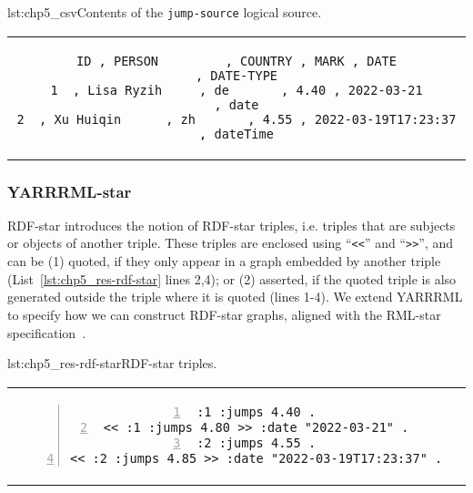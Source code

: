 \noindent\begin{minipage}{\linewidth}
\centering
\begin{captionedlisting}
{lst:chp5_csv}{Contents of the \texttt{jump-source} logical source.}
\centering
\begin{tabular}{c}
{\begin{lstlisting}[basicstyle=\ttfamily\small,columns=flexible]
ID , PERSON         , COUNTRY , MARK , DATE                       , DATE-TYPE
1  , Lisa Ryzih     , de       , 4.40 , 2022-03-21                , date
2  , Xu Huiqin      , zh       , 4.55 , 2022-03-19T17:23:37       , dateTime
\end{lstlisting}}
\end{tabular}
\end{captionedlisting}
\end{minipage}

\subsubsection{YARRRML-star} %


RDF-star introduces the notion of RDF-star triples, i.e. triples that are subjects or objects of another triple. These triples are enclosed using ``\texttt{<<}'' and ``\texttt{>>}'', and can be (1) quoted, if they only appear in a graph embedded by another triple (List~\ref{lst:chp5_res-rdf-star} lines 2,4); or (2) asserted, if the quoted triple is also generated outside the triple where it is quoted (lines 1-4).
We extend YARRRML to specify how we can construct RDF-star graphs, aligned with the RML-star specification~\parencite{iglesias2022rmlstar}.

\begin{minipage}{\linewidth}
\centering
\begin{captionedlisting}{lst:chp5_res-rdf-star}{RDF-star triples.}
\centering
\begin{tabular}{c}
{\begin{lstlisting}[numbers=left,basicstyle=\ttfamily\small,columns=flexible]
:1 :jumps 4.40 .
<< :1 :jumps 4.80 >> :date "2022-03-21" .
:2 :jumps 4.55 .
<< :2 :jumps 4.85 >> :date "2022-03-19T17:23:37" .
\end{lstlisting}}
\end{tabular}
\end{captionedlisting}
\end{minipage}

